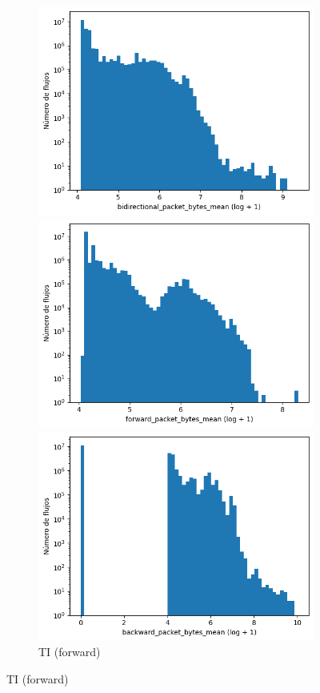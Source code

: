 \begin{figure}[H]
\begin{subfigure}[b]{0.26\textwidth}
        \includegraphics[width=\linewidth]{media/packet_pincer_toniot/bidirectional_packet_bytes_mean_log_x_log_y.png}
        \caption{TI (bidir.)} \label{fig:packet_pincer_packet_bytes_mean_ti_bidir}
        \includegraphics[width=\textwidth]{media/packet_pincer_toniot/forward_packet_bytes_mean_log_x_log_y.png}
        \caption{TI (forward)}
        \includegraphics[width=\textwidth]{media/packet_pincer_toniot/backward_packet_bytes_mean_log_x_log_y.png}

\end{subfigure}
\end{figure}
